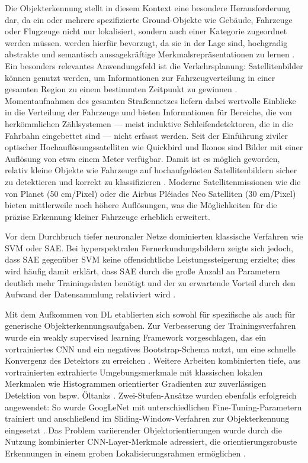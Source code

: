 Die Objekterkennung stellt in diesem Kontext eine besondere Herausforderung dar, da ein oder mehrere spezifizierte Ground-Objekte wie Gebäude, Fahrzeuge oder Flugzeuge nicht nur lokalisiert, sondern auch einer Kategorie zugeordnet werden müssen.  werden hierfür bevorzugt, da sie in der Lage sind, hochgradig abstrakte und semantisch aussagekräftige Merkmalsrepräsentationen zu lernen \cite{Zhu2017}. Ein besonders relevantes Anwendungsfeld ist die Verkehrsplanung: Satellitenbilder können genutzt werden, um Informationen zur Fahrzeugverteilung in einer gesamten Region zu einem bestimmten Zeitpunkt zu gewinnen \cite{Eikvil2009}. Momentaufnahmen des gesamten Straßennetzes liefern dabei wertvolle Einblicke in die Verteilung der Fahrzeuge und bieten Informationen für Bereiche, die von herkömmlichen Zählsystemen — meist induktive Schleifendetektoren, die in die Fahrbahn eingebettet sind — nicht erfasst werden. Seit der Einführung ziviler optischer Hochauflösungssatelliten wie Quickbird und Ikonos sind Bilder mit einer Auflösung von etwa einem Meter verfügbar. Damit ist es möglich geworden, relativ kleine Objekte wie Fahrzeuge auf hochaufgelösten Satellitenbildern sicher zu detektieren und korrekt zu klassifizieren \cite{Eikvil2009}. Moderne Satellitenmissionen wie die von Planet (50 cm/Pixel) \cite{planet_labs} oder die Airbus Pléiades Neo Satelliten (30 cm/Pixel) \cite{airbus_neo} bieten mittlerweile noch höhere Auflösungen, was die Möglichkeiten für die präzise Erkennung kleiner Fahrzeuge erheblich erweitert.

Vor dem Durchbruch tiefer neuronaler Netze dominierten klassische Verfahren wie \Acrfull{SVM} oder \Acrfull{SAE}. Bei hyperspektralen Fernerkundungsbildern zeigte sich jedoch, dass \Acrshort{SAE} gegenüber \Acrshort{SVM} keine offensichtliche Leistungssteigerung erzielte; dies wird häufig damit erklärt, dass \acrshort{SAE} durch die große Anzahl an Parametern deutlich mehr Trainingsdaten benötigt und der zu erwartende Vorteil durch den Aufwand der Datensammlung relativiert wird \cite{Liu2017}.

Mit dem Aufkommen von \Acrlong{DL} etablierten sich  sowohl für spezifische als auch für generische Objekterkennungsaufgaben. Zur Verbesserung der Trainingsverfahren wurde ein weakly supervised learning Framework vorgeschlagen, das ein vortrainiertes \acrshort{CNN} und ein negatives Bootstrap-Schema nutzt, um eine schnelle Konvergenz des Detektors zu erreichen \cite{Zhou2016}. Weitere Arbeiten kombinierten tiefe, aus vortrainierten  extrahierte Umgebungsmerkmale mit klassischen lokalen Merkmalen wie Histogrammen orientierter Gradienten \cite{Dalal2005} zur zuverlässigen Detektion von bspw. Öltanks \cite{Zhang2015}. Zwei-Stufen-Ansätze wurden ebenfalls erfolgreich angewendet: So wurde GoogLeNet mit unterschiedlichen Fine-Tuning-Parametern trainiert und anschließend im Sliding-Window-Verfahren zur Objekterkennung eingesetzt \cite{Sevo2016}. Das Problem variierender Objektorientierungen wurde durch die Nutzung kombinierter \acrshort{CNN}-Layer-Merkmale adressiert, die orientierungsrobuste Erkennungen in einem groben Lokalisierungsrahmen ermöglichen \cite{Zhu2015}.

